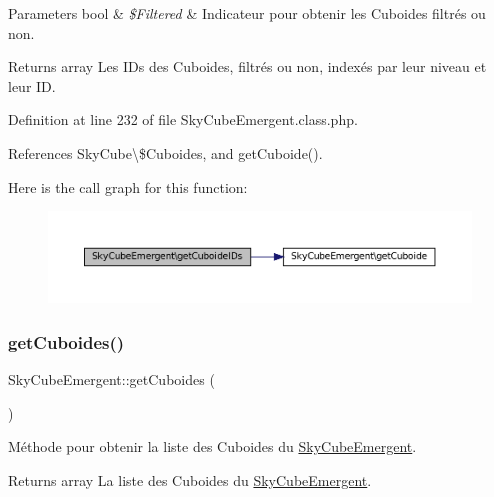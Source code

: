 \begin{DoxyParams}[1]{Parameters}
bool & {\em \$\+Filtered} & Indicateur pour obtenir les Cuboides filtrés ou non. \\
\hline
\end{DoxyParams}
\begin{DoxyReturn}{Returns}
array Les I\+Ds des Cuboides, filtrés ou non, indexés par leur niveau et leur ID. 
\end{DoxyReturn}


Definition at line 232 of file Sky\+Cube\+Emergent.\+class.\+php.



References Sky\+Cube\textbackslash{}\$\+Cuboides, and get\+Cuboide().

Here is the call graph for this function\+:\nopagebreak
\begin{figure}[H]
\begin{center}
\leavevmode
\includegraphics[width=350pt]{class_sky_cube_emergent_ab24162e08074631a59fa8296297ba83f_cgraph}
\end{center}
\end{figure}
\mbox{\label{class_sky_cube_emergent_a0b0ce3c41a95b6ad6e08fead3b039aef}} 
\subsubsection{\texorpdfstring{get\+Cuboides()}{getCuboides()}}
{\footnotesize\ttfamily Sky\+Cube\+Emergent\+::get\+Cuboides (\begin{DoxyParamCaption}{ }\end{DoxyParamCaption})}

Méthode pour obtenir la liste des Cuboides du \hyperlink{class_sky_cube_emergent}{Sky\+Cube\+Emergent}.

\begin{DoxyReturn}{Returns}
array La liste des Cuboides du \hyperlink{class_sky_cube_emergent}{Sky\+Cube\+Emergent}. 
\end{DoxyReturn}


